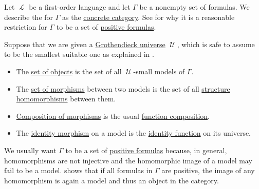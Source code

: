 \begin{definition}\label{def:category_of_small_first_order_models}
  Let \( \mscrL \) be a first-order language and let \( \Gamma \) be a nonempty set of formulas. We describe the  for \( \Gamma \) as the \hyperref[def:concrete_category]{concrete category}. See  for why it is a reasonable restriction for \( \Gamma \) to be a set of \hyperref[def:positive_formula]{positive formulas}.

  Suppose that we are given a \hyperref[def:grothendieck_universe]{Grothendieck universe} \( \mscrU \), which is safe to assume to be the smallest suitable one as explained in .

  \begin{itemize}
    \item The \hyperref[def:category/objects]{set of objects} is the set of all \( \mscrU \)-small models of \( \Gamma \).

    \item The \hyperref[def:category/morphisms]{set of morphisms} between two models is the set of all \hyperref[def:first_order_homomorphism]{structure homomorphisms} between them.

    \item \hyperref[def:category/composition]{Composition of morphisms} is the usual \hyperref[def:multi_valued_function/composition]{function composition}.

    \item The \hyperref[def:category/identity]{identity morphism} on a model is the \hyperref[def:multi_valued_function/identity]{identity function} on its universe.
  \end{itemize}
\end{definition}

\begin{remark}\label{rem:positive_formulas_in_category_of_models}
  We usually want \( \Gamma \) to be a set of \hyperref[def:positive_formula]{positive formulas} because, in general, homomorphisms are not injective and the homomorphic image of a model may fail to be a model.  shows that if all formulas in \( \Gamma \) are positive, the image of any homomorphism is again a model and thus an object in the category.
\end{remark}

